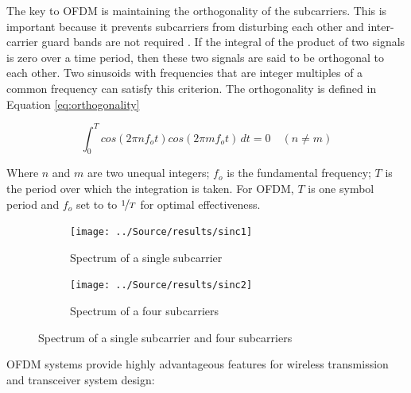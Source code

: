 The key to OFDM is maintaining the orthogonality of the subcarriers. This is important because it prevents subcarriers from disturbing each other and inter-carrier guard bands are not required \cite{wikiOFDM}. If the integral of the product of two signals is zero over a time period, then these two signals are said to be orthogonal to each other. Two sinusoids with frequencies that are integer multiples of a common frequency can satisfy this criterion. The orthogonality is defined in Equation \ref{eq:orthogonality}

\begin{equation}\label{eq:orthogonality}
    \int_{0}^{T} cos(2 \pi n f_o t) cos(2 \pi m f_o t) \,dt = 0 \quad (n \neq m)
\end{equation}

Where $n$ and $m$ are two unequal integers; $f_o$ is the fundamental frequency; $T$ is the period over which the integration is taken. For OFDM, $T$ is one symbol period and $f_o$ set to to $\nicefrac{1}{T}$ for optimal effectiveness.

\begin{figure}[htbp]
    \centering
    \begin{subfigure}[t]{.49\linewidth}
        \texttt{[image: ../Source/results/sinc1]}
        \caption{Spectrum of a single subcarrier}
        \label{fig:single}
    \end{subfigure}
    \hfil
    \begin{subfigure}[t]{0.49\linewidth}
        \texttt{[image: ../Source/results/sinc2]}
        \caption{Spectrum of a four subcarriers}
        \label{fig:four}
    \end{subfigure}
    \caption{Spectrum of a single subcarrier and four subcarriers}
    \label{fig:sinx}
\end{figure}

OFDM systems provide highly advantageous features for wireless transmission and transceiver system design:


